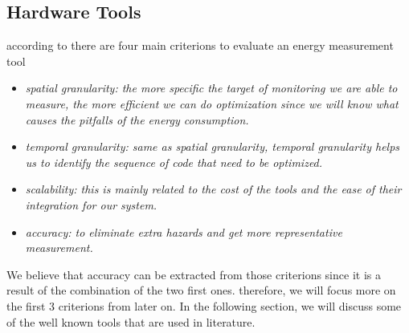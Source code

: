 \subsection{Hardware Tools}
according to \citeauthor{hackenberg2014hdeem} there are four main criterions to evaluate an energy measurement tool \cite{hackenberg2014hdeem}
\begin{itemize}
    \item \em{spatial granularity}: the more specific the target of monitoring we are able to measure, the more efficient we can do optimization since we will know what causes the pitfalls of the energy consumption.
    \item \em{temporal granularity}: same as spatial granularity, temporal granularity helps us to identify the sequence of code that need to be optimized.
    \item \em{scalability}: this is mainly related to the cost of the tools and the ease of their integration for our system.
    \item  \em{accuracy}: to eliminate extra hazards and get more representative measurement.
\end{itemize}

We believe that accuracy can be extracted from those criterions since it is a result of the combination of the two first ones. therefore, we will focus more on the first 3 criterions from later on.
In the following section, we will discuss some of the well known tools that are used in literature.


